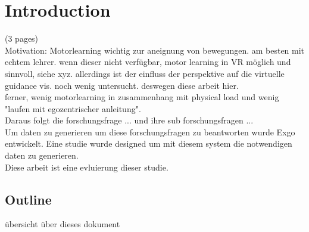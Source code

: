 \chapter{Introduction}
(3 pages)\\
Motivation: Motorlearning wichtig zur aneignung von bewegungen. am besten mit echtem lehrer. wenn dieser nicht verfügbar, motor learning in VR möglich und sinnvoll, siehe xyz. allerdings ist der einfluss der perspektive auf die virtuelle guidance vis. noch wenig untersucht. deswegen diese arbeit hier.\\
ferner, wenig motorlearning in zusammenhang mit physical load und wenig "laufen mit egozentrischer anleitung".\\
Daraus folgt die forschungsfrage ... und ihre sub forschungsfragen ...\\
Um daten zu generieren um diese forschungsfragen zu beantworten wurde Exgo entwickelt. Eine studie wurde designed um mit diesem system die notwendigen daten zu generieren.\\
Diese arbeit ist eine evluierung dieser studie.\\
\cite{Muckell}
\section{Outline}
übersicht über dieses dokument